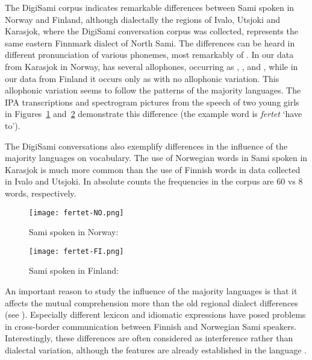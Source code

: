 \documentclass[runningheads,a4paper]{llncs}
\begin{document}
The DigiSami corpus indicates remarkable differences between Sami spoken in Norway and Finland, although dialectally the regions of Ivalo, Utsjoki and Karasjok, where the DigiSami conversation corpus was collected, represents the same eastern Finnmark dialect of North Sami. The differences can be heard in different pronunciation of various phonemes, most remarkably of .
In our data from Karasjok in Norway,  has several allophones, occurring as \textipa{[\o]}, \textipa{[r]}, \textipa{[\*r]} and \textipa{[\textfishhookr]}, while in our data from Finland it occurs only as \textipa{[r]} with no allophonic variation. This allophonic variation seems to follow the patterns of the majority languages. The IPA transcriptions and spectrogram pictures from the speech of two young girls in Figures~\ref{fig:fertet-NO} and~\ref{fig:fertet-FI} demonstrate this difference (the example word is \textit{fertet} `have to').

The DigiSami conversations also exemplify differences in the influence of the majority languages on vocabulary. The use of Norwegian words in Sami spoken in Karasjok is much more common than the use of Finnish words in data collected in Ivalo and Utsjoki. In absolute counts the frequencies in the corpus are 60 vs 8 words, respectively.

\begin{figure}[htb]
\texttt{[image: fertet-NO.png]}
\caption{Sami spoken in Norway: }
\label{fig:fertet-NO}
\end{figure}

\begin{figure}[htb]
\texttt{[image: fertet-FI.png]}
\caption{Sami spoken in Finland: }
\label{fig:fertet-FI}
\end{figure}

An important reason to study the influence of the majority languages is that it affects the mutual comprehension more than the old regional dialect differences (see \cite{Sammallahti:98}). Especially different lexicon and idiomatic expressions have posed problems in cross-border communication between Finnish and Norwegian Sami speakers. Interestingly, these differences are often considered as interference rather than dialectal variation, although the features are already established in the language \cite{Aikio:ea:14}.
\end{document}
